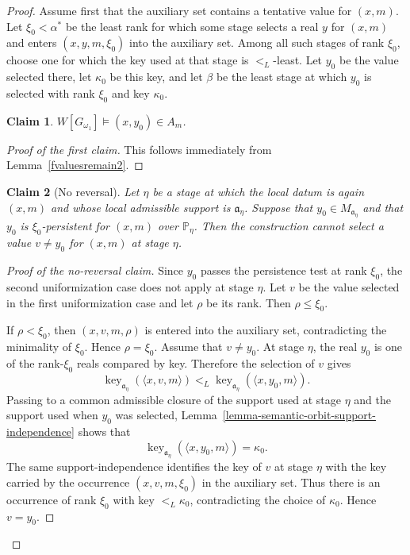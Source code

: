 \documentclass[a4paper,11pt]{article}
\newtheorem*{claim}{Claim}
\newcommand{\forceP}{\mathbb{P}}
\newcommand{\key}{\operatorname{key}}
\begin{document}
\begin{proof}
Assume first that the auxiliary set contains a tentative value for $(x,m)$.
Let $\xi_0<\alpha^\ast$ be the least rank for which some stage selects a
real $y$ for $(x,m)$ and enters $(x,y,m,\xi_0)$ into the auxiliary set.
Among all such stages of rank $\xi_0$, choose one for which the key used at
that stage is $<_L$-least.  Let $y_0$ be the value selected there, let
$\kappa_0$ be this key, and let $\beta$ be the least stage at which
$y_0$ is selected with rank $\xi_0$ and key $\kappa_0$.
\par \medskip

\begin{claim}
$W[G_{\omega_1}] \models (x,y_0) \in A_m$.
\end{claim}
\begin{proof}[Proof of the first claim]
This follows immediately from Lemma~\ref{fvaluesremain2}.
\end{proof}

\par \medskip

\begin{claim}[No reversal]
Let $\eta$ be a stage at which the local datum is again $(x,m)$ and whose
local admissible support is $\mathfrak a_\eta$.  Suppose that
$y_0\in M_{\mathfrak a_\eta}$ and that $y_0$ is $\xi_0$-persistent for
$(x,m)$ over $\forceP_\eta$.  Then the construction cannot select a value
$v\neq y_0$ for $(x,m)$ at stage $\eta$.
\end{claim}
\begin{proof}[Proof of the no-reversal claim]
Since $y_0$ passes the persistence test at rank $\xi_0$, the second
uniformization case does not apply at stage $\eta$.  Let $v$ be the value
selected in the first uniformization case and let $\rho$ be its rank.  Then
$\rho\leq\xi_0$.

If $\rho<\xi_0$, then $(x,v,m,\rho)$ is entered into the auxiliary set,
contradicting the minimality of $\xi_0$.  Hence $\rho=\xi_0$.
Assume that $v\neq y_0$.  At stage $\eta$, the real $y_0$ is one of the
rank-$\xi_0$ reals compared by key.  Therefore the selection of $v$ gives
\[
   \key_{\mathfrak a_\eta}(\langle x,v,m\rangle)
   <_L
   \key_{\mathfrak a_\eta}(\langle x,y_0,m\rangle).
\]
Passing to a common admissible closure of the support used at stage $\eta$
and the support used when $y_0$ was selected, Lemma~\ref{lemma-semantic-orbit-support-independence}
shows that
\[
   \key_{\mathfrak a_\eta}(\langle x,y_0,m\rangle)=\kappa_0.
\]
The same support-independence identifies the key of $v$ at stage $\eta$
with the key carried by the occurrence $(x,v,m,\xi_0)$ in the auxiliary
set.  Thus there is an occurrence of rank $\xi_0$ with key $<_L\kappa_0$,
contradicting the choice of $\kappa_0$.  Hence $v=y_0$.
\end{proof}


\end{proof}
\end{document}
